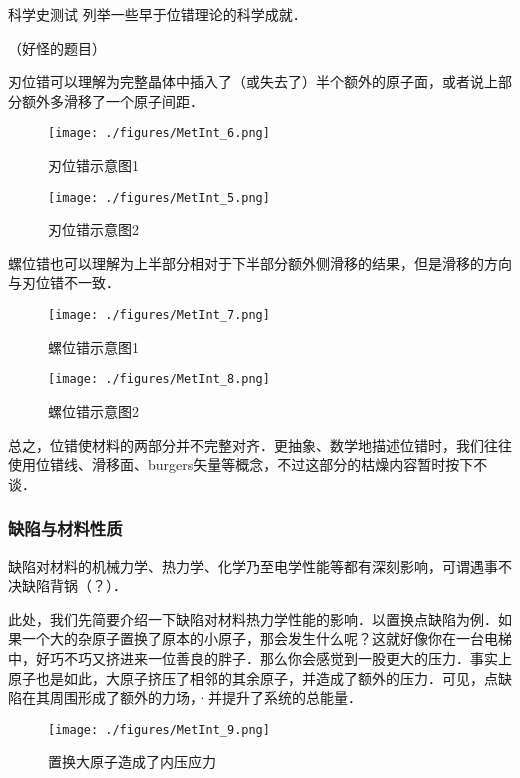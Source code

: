\begin{exercise}{科学史测试}
列举一些早于位错理论的科学成就．

（好怪的题目）
\end{exercise}

刃位错可以理解为完整晶体中插入了（或失去了）半个额外的原子面，或者说上部分额外多滑移了一个原子间距．
\begin{figure}[ht]
\centering
\texttt{[image: ./figures/MetInt\_6.png]}
\caption{刃位错示意图1} \label{MetInt_fig6}
\end{figure}
\begin{figure}[ht]
\centering
\texttt{[image: ./figures/MetInt\_5.png]}
\caption{刃位错示意图2} \label{MetInt_fig5}
\end{figure}

螺位错也可以理解为上半部分相对于下半部分额外侧滑移的结果，但是滑移的方向与刃位错不一致．
\begin{figure}[ht]
\centering
\texttt{[image: ./figures/MetInt\_7.png]}
\caption{螺位错示意图1} \label{MetInt_fig7}
\end{figure}
\begin{figure}[ht]
\centering
\texttt{[image: ./figures/MetInt\_8.png]}
\caption{螺位错示意图2} \label{MetInt_fig8}
\end{figure}

总之，位错使材料的两部分并不完整对齐．更抽象、数学地描述位错时，我们往往使用位错线、滑移面、burgers矢量等概念，不过这部分的枯燥内容暂时按下不谈．


\subsubsection{缺陷与材料性质}
缺陷对材料的机械力学、热力学、化学乃至电学性能等都有深刻影响，可谓遇事不决缺陷背锅（？）．

此处，我们先简要介绍一下缺陷对材料热力学性能的影响．以置换点缺陷为例．如果一个大的杂原子置换了原本的小原子，那会发生什么呢？这就好像你在一台电梯中，好巧不巧又挤进来一位善良的胖子．那么你会感觉到一股更大的压力．事实上原子也是如此，大原子挤压了相邻的其余原子，并造成了额外的压力．可见，点缺陷在其周围形成了额外的力场，·并提升了系统的总能量．
\begin{figure}[ht]
\centering
\texttt{[image: ./figures/MetInt\_9.png]}
\caption{置换大原子造成了内压应力} \label{MetInt_fig9}
\end{figure}


